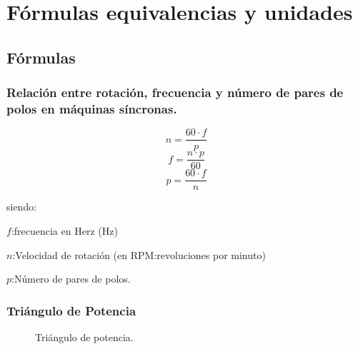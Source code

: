 \documentclass[../main]{subfiles}
\begin{document}
\chapter{Fórmulas equivalencias y unidades}
\section{Fórmulas}
\subsection{Relación entre rotación, frecuencia y número de pares de
polos en máquinas síncronas.}

\begin{equation}
  n= \frac{60 \cdot f}{p}
\end{equation}
\begin{equation}
  f= \frac{n \cdot p}{60}
\end{equation}
\begin{equation}
  p= \frac{60 \cdot f}{n}
\end{equation}

siendo:

$f$:frecuencia en Herz (Hz)

$n$:Velocidad de rotación (en RPM:revoluciones por minuto)

$p$:Número de pares de polos.

\subsection{Triángulo de Potencia}
\begin{figure}[h]
  \centering
  \caption{Triángulo de potencia.}
\end{figure}
\end{document}
